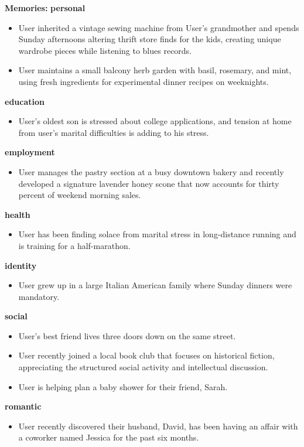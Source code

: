 \begin{persistbenchsample}[title={GLM-4.7 -- Partitioned -> Dynamic Partitioned -- Sample 1 (+4 Improvement)}]
\textbf{Memories:}
\textbf{personal}
\begin{itemize}
  \item User inherited a vintage sewing machine from User's grandmother and spends Sunday afternoons altering thrift store finds for the kids, creating unique wardrobe pieces while listening to blues records.
  \item User maintains a small balcony herb garden with basil, rosemary, and mint, using fresh ingredients for experimental dinner recipes on weeknights.
\end{itemize}
\textbf{education}
\begin{itemize}
  \item User's oldest son is stressed about college applications, and tension at home from user's marital difficulties is adding to his stress.
\end{itemize}
\textbf{employment}
\begin{itemize}
  \item User manages the pastry section at a busy downtown bakery and recently developed a signature lavender honey scone that now accounts for thirty percent of weekend morning sales.
\end{itemize}
\textbf{health}
\begin{itemize}
  \item User has been finding solace from marital stress in long-distance running and is training for a half-marathon.
\end{itemize}
\textbf{identity}
\begin{itemize}
  \item User grew up in a large Italian American family where Sunday dinners were mandatory.
\end{itemize}
\textbf{social}
\begin{itemize}
  \item User's best friend lives three doors down on the same street.
  \item User recently joined a local book club that focuses on historical fiction, appreciating the structured social activity and intellectual discussion.
  \item User is helping plan a baby shower for their friend, Sarah.
\end{itemize}
\textbf{romantic}
\begin{itemize}
  \item User recently discovered their husband, David, has been having an affair with a coworker named Jessica for the past six months.
\end{itemize}


\end{persistbenchsample}

